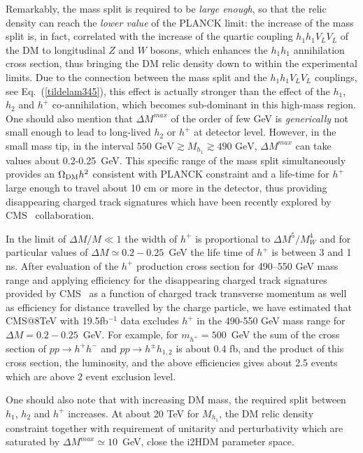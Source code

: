 \documentclass[12pt,a4paper]{article}
\begin{document}
Remarkably, the mass split is required to be {\it large enough}, so that the relic density can reach the {\it lower value} of the PLANCK limit: the increase of  the mass
split is, in fact, correlated with the increase of the quartic coupling $h_1 h_1 V_L V_L$ of the DM to longitudinal $Z$ and $W$ bosons,
which enhances the $h_1 h_1$ annihilation cross section, thus bringing
the DM relic density down to within the experimental limits. Due to the connection between the mass split and the $h_1 h_1 V_L V_L$ couplings, 
see Eq.~(\ref{tildelam345}),
this effect is actually stronger than the effect of the
$h_1$, $h_2$ and $h^+$ co-annihilation, which becomes sub-dominant in this high-mass region.
One should also mention that  $\Delta M^{max}$ of the order of few GeV  is {\it generically} not 
small enough to lead to long-lived $h_2$ or $h^+$ at detector level.
However, in the small mass tip, in the interval
$550\mbox{ GeV} \gtrsim M_{h_1}\gtrsim 490\mbox{ GeV}$,  $\Delta M^{max}$ can take values 
about 0.2-0.25~GeV. This specific range of the mass split simultaneously provides an $\Omega_{\rm DM} h^2$ consistent with 
PLANCK constraint and a life-time for $h^+$ large enough to travel about 10 cm or more in the  detector, thus
providing disappearing charged track signatures which have been recently explored  by  CMS~\cite{CMS:2014gxa}
collaboration.

In the limit of $\Delta M/M\ll 1$ the width of  $h^+$ is proportional to  $\Delta M^5/M_W^4$
and for particular values of $\Delta M\simeq 0.2-0.25$~GeV the  life time of  $h^+$ is between 3 and 1 ns.
After evaluation of the  $h^+$ production cross section for  490--550 GeV mass range
and applying efficiency for the  disappearing charged track signatures provided by  CMS~\cite{CMS:2014gxa}
as a function of charged track transverse momentum as well as efficiency for distance travelled by the charge particle,
we have estimated  that CMS@8TeV with 19.5fb$^{-1}$ data excludes  $h^+$  in the 490-550 GeV mass range for   $\Delta M=0.2-0.25$~GeV.
For example, for $m_{h^+}=500$~GeV the sum of the cross section of $pp\to{h^+}{h^-}$ and  $pp\to{h^\pm}{h_{1,2}}$
is about 0.4 fb, and the product of this cross section, the luminosity, and the above efficiencies gives about 2.5 events
which are above 2 event exclusion level.


One should also note that with increasing DM mass, the required split between $h_1$, $h_2$ and $h^+$
increases.
At about 20 TeV for $M_{h_1}$, the DM relic density constraint together with 
requirement of unitarity and perturbativity which are saturated by  $\Delta M^{max}\simeq 10$~GeV,
close the i2HDM parameter space.
\end{document}
